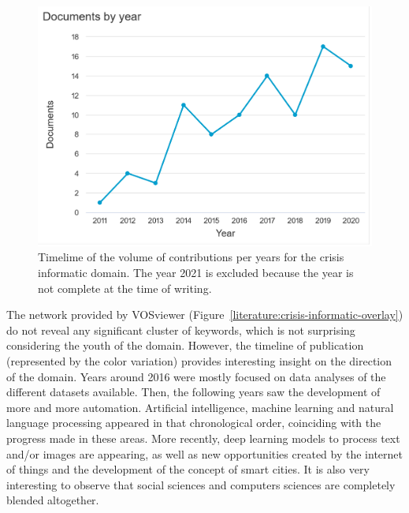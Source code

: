 \begin{figure}[bp]
    \centering
    \includegraphics[width=\textwidth]{figures/chap-2/crisis-informatic-hist.pdf}
    \caption{Timelime of the volume of contributions per years for the crisis informatic domain. The year 2021 is excluded because the year is not complete at the time of writing.}
    \label{literature:crisis-informatic-hist}
\end{figure}

The network provided by VOSviewer (Figure~\ref{literature:crisis-informatic-overlay}) do not reveal any significant cluster of keywords, which is not surprising considering the youth of the domain.
However, the timeline of publication (represented by the color variation) provides interesting insight on the direction of the domain.
Years around 2016 were mostly focused on data analyses of the different datasets available.
Then, the following years saw the development of more and more automation.
Artificial intelligence, machine learning and natural language processing appeared in that chronological order, coinciding with the progress made in these areas.
More recently, deep learning models to process text and/or images are appearing, as well as new opportunities created by the internet of things and the development of the concept of smart cities.
It is also very interesting to observe that social sciences and computers sciences are completely blended altogether.

